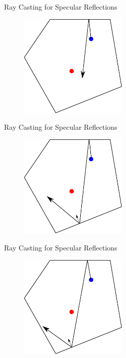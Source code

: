 \documentclass{beamer}
\begin{document}
\begin{frame}{Ray Casting for Specular Reflections}

\begin{figure}[t]
	\centering
    \includegraphics[width=0.46\textwidth]{ImageSources3.pdf}
\end{figure}

\end{frame}

\begin{frame}{Ray Casting for Specular Reflections}

\begin{figure}[t]
	\centering
    \includegraphics[width=0.46\textwidth]{ImageSourcesMulti1.pdf}
\end{figure}

\end{frame}

\begin{frame}{Ray Casting for Specular Reflections}

\begin{figure}[t]
	\centering
    \includegraphics[width=0.46\textwidth]{ImageSourcesMulti2.pdf}
\end{figure}

\end{frame}
\end{document}
